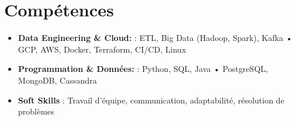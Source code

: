 \documentclass[11pt,a4paper,sans]{moderncv}
\begin{document}
  \vspace{-15pt}
  \section{\fontsize{11}{12.1}\selectfont Compétences}
  \vspace{-6pt}
  \begin{itemize}[leftmargin=0cm, itemsep=-2pt, topsep=0pt, partopsep=0pt, parsep=0pt, label={}]
    \item \textbf{Data Engineering & Cloud:} : ETL, Big Data (Hadoop, Spark), Kafka • GCP, AWS, Docker, Terraform, CI/CD, Linux
    \item \textbf{Programmation & Données:} : Python, SQL, Java • PostgreSQL, MongoDB, Cassandra
    \item \textbf{Soft Skills} : Travail d’équipe, communication, adaptabilité, résolution de problèmes
  \end{itemize} 

 

  
\end{document}
